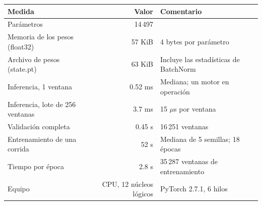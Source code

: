 \begin{tabular}{lrp{4.5cm}}
\toprule
\textbf{Medida} & \textbf{Valor} & \textbf{Comentario} \\
\midrule
Parámetros & 14\,497 &  \\
Memoria de los pesos (float32) & 57 KiB & 4 bytes por parámetro \\
Archivo de pesos (state.pt) & 63 KiB & Incluye las estadísticas de BatchNorm \\
Inferencia, 1 ventana & 0.52 ms & Mediana; un motor en operación \\
Inferencia, lote de 256 ventanas & 3.7 ms & 15 $\mu$s por ventana \\
Validación completa & 0.45 s & 16\,251 ventanas \\
Entrenamiento de una corrida & 52 s & Mediana de 5 semillas; 18 épocas \\
Tiempo por época & 2.8 s & 35\,287 ventanas de entrenamiento \\
Equipo & CPU, 12 núcleos lógicos & PyTorch 2.7.1, 6 hilos \\
\bottomrule
\end{tabular}
